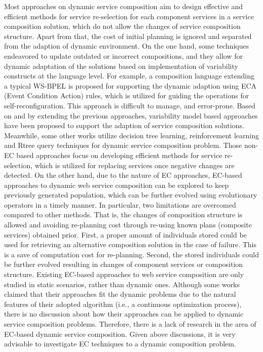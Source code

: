 Most approaches on dynamic service composition aim to design effective and efficient methods for service re-selection for each component services in a service composition solution, which do not allow the changes of service composition structure. Apart from that, the cost of initial planning is ignored and separated from the adaption of dynamic environment. On the one hand, some techniques \cite{andrews2003business,baresi2011self,koning2009vxbpel} endeavored to update outdated or incorrect compositions, and they allow for dynamic adaptation of the solutions based on implementation of variability constructs at the language level. For example, a composition language extending a typical WS-BPEL \cite{andrews2003business} is proposed for supporting the dynamic adaption using ECA (Event Condition Action) rules, which is utilized for guiding the operations for self-reconfiguration. This approach is difficult to manage, and error-prone. Based on and by extending the previous approaches, variability model based approaches \cite{alferez2014dynamic} have been proposed to support the adaption of service composition solutions. Meanwhile, some other works \cite{mohanty2010web,salas2006ws,wagner2016robust,yin2010qos} utilize decision tree learning, reinforcement learning and Rtree query techniques for dynamic service composition problem. Those non-EC based approaches focus on developing efficient methods for service re-selection, which is utilized for replacing services once negative changes are detected. On the other hand, due to the nature of EC approaches, EC-based approaches to dynamic web service composition can be explored to keep previously generated population, which can be further evolved using evolutionary operators in a timely manner. In particular, two limitations are overcomed compared to other methods. That is, the changes of composition structure is allowed and avoiding re-planning cost through re-using known plans (composite services) obtained prior. First, a proper amount of individuals stored could be used for retrieving an alternative composition solution in the case of failure. This is a save of computation cost for re-planning. Second, the stored individuals could be further evolved resulting in changes of component services or composition structure. Existing EC-based approaches to web service composition are only studied in static scenarios, rather than dynamic ones. Although some works \cite{feng2013dynamic,liu2005dynamic} claimed that their approaches fit the dynamic problems due to the natural features of their adopted algorithm (i.e., a continuous optimization process), there is no discussion about how their approaches can be applied to dynamic service composition problems. Therefore, there is a lack of research in the area of EC-based dynamic service composition. Given above discussions, it is very advisable to investigate EC techniques to a dynamic composition problem.


